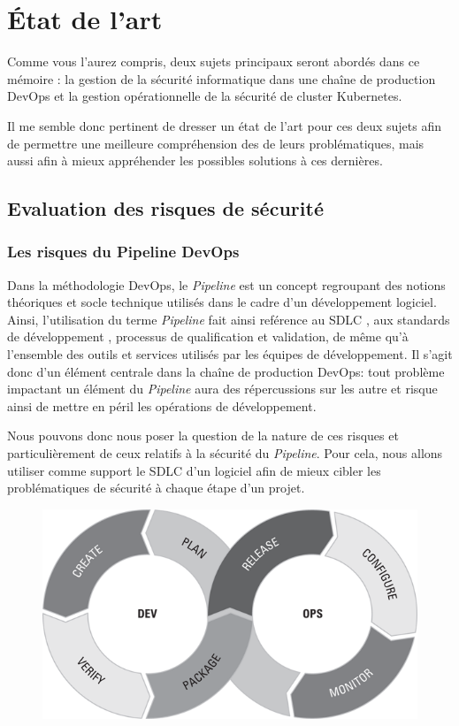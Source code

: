 \chapter{État de l'art}

Comme vous l'aurez compris, deux sujets principaux seront abordés dans ce mémoire : la gestion de la sécurité informatique
dans une chaîne de production DevOps et la gestion opérationnelle de la sécurité de cluster Kubernetes. 

Il me semble donc pertinent de dresser un état de l'art pour ces deux sujets afin de permettre une meilleure compréhension des
de leurs problématiques, mais aussi afin à mieux appréhender les possibles solutions à ces dernières.

\section{Evaluation des risques de sécurité}
\subsection{Les risques du Pipeline DevOps}

Dans la méthodologie DevOps, le \emph{Pipeline} est un concept regroupant des notions théoriques et socle technique utilisés dans 
le cadre d'un développement logiciel. Ainsi, l'utilisation du terme \emph{Pipeline} fait ainsi reférence au \ac{SDLC}
\autocite[Ch.\ 6]{devops_for_dummies_freeman_forsgren_2019}, aux standards de développement
\autocite[Ch.\ 9]{devops_for_dummies_freeman_forsgren_2019}, processus de qualification et 
validation, de même qu'à l'ensemble des outils et services utilisés par les équipes de développement. Il s'agit donc d'un élément
centrale dans la chaîne de production DevOps: tout problème impactant un élément du \emph{Pipeline} aura des répercussions sur les 
autre et risque ainsi de mettre en péril les opérations de développement.

Nous pouvons donc nous poser la question de la nature de ces risques et particulièrement de ceux relatifs à la sécurité du 
\emph{Pipeline}. Pour cela, nous allons utiliser comme support le \ac{SDLC} d'un logiciel afin de mieux cibler les problématiques
de sécurité à chaque étape d'un projet.

\vspace{2em}
\begin{figure}[h]
    \centering
    \includegraphics[width=0.5\linewidth]{resources/img/devops_lifecycle.png}
    \label{fig:devops-lifecycle}
\end{figure}
\newpage

